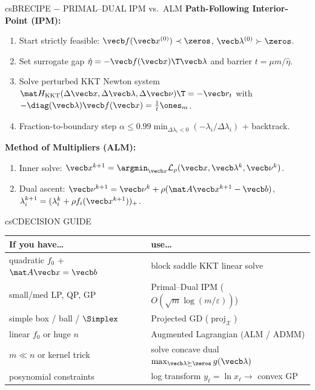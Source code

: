 \documentclass[../../../../master.tex]{subfiles}
\begin{document}
\begin{cscolumns}
\begin{cscard}{csB}{RECIPE $-$ PRIMAL--DUAL IPM vs.\ ALM}
  \textbf{Path-Following Interior-Point (IPM):}
  \begin{enumerate}[leftmargin=1.2em, itemsep=1pt, topsep=1pt, parsep=0pt]
    \item Start strictly feasible: $\vecb f(\vecb x^{(0)})\prec\zeros$, $\vecb\lambda^{(0)}\succ\zeros$.
    \item Set surrogate gap $\hat\eta=-\vecb f(\vecb x)\T\vecb\lambda$ and barrier $t=\mu m/\hat\eta$.
    \item Solve perturbed KKT Newton system $\mat H_{\mathrm{KKT}}(\Delta\vecb x,\Delta\vecb\lambda,\Delta\vecb\nu)\T=-\vecb r_t$ with $-\diag(\vecb\lambda)\vecb f(\vecb x)=\frac{1}{t}\ones_m$.
    \item Fraction-to-boundary step $\alpha\le 0.99\min_{\Delta\lambda_i<0}(-\lambda_i/\Delta\lambda_i)$ + backtrack.
  \end{enumerate}
  \vspace{2pt}
  \textbf{Method of Multipliers (ALM):}
  \begin{enumerate}[leftmargin=1.2em, itemsep=1pt, topsep=1pt, parsep=0pt]
    \item Inner solve: $\vecb x^{k+1}=\argmin_{\vecb x}\mathcal L_\rho(\vecb x,\vecb\lambda^k,\vecb\nu^k)$.
    \item Dual ascent: $\vecb\nu^{k+1}=\vecb\nu^k+\rho(\mat A\vecb x^{k+1}-\vecb b)$, $\lambda_i^{k+1}=(\lambda_i^k+\rho f_i(\vecb x^{k+1}))_+$.
  \end{enumerate}
\end{cscard}
\columnbreak

\begin{cscard}{csC}{DECISION GUIDE}
  \renewcommand{\arraystretch}{1.22}\small
  \begin{tabular}{@{}>{\raggedright\arraybackslash}p{3.1cm}>{\raggedright\arraybackslash}p{4.6cm}@{}}
    \textbf{If you have\ldots} & \textbf{use\ldots}\\ \hline
    quadratic $f_0$ + $\mat A\vecb x=\vecb b$ & block saddle KKT linear solve\\
    small/med LP, QP, GP & Primal--Dual IPM ($O(\sqrt m\log(m/\varepsilon))$)\\
    simple box / ball / $\Simplex$ & Projected GD ($\operatorname{proj}_{\mathcal X}$)\\
    linear $f_0$ or huge $n$ & Augmented Lagrangian (ALM / ADMM)\\
    $m\ll n$ or kernel trick & solve concave dual $\max_{\vecb\lambda\succeq\zeros}g(\vecb\lambda)$\\
    posynomial constraints & log transform $y_\ell=\ln x_\ell \to$ convex GP\\
  \end{tabular}
\end{cscard}


\end{cscolumns}
\end{document}
